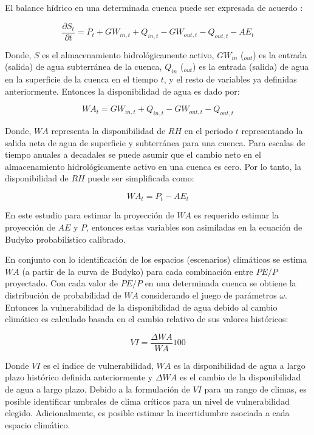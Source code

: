 \documentclass[12pt]{article}
\begin{document}
El balance hídrico en una determinada cuenca puede ser expresada de acuerdo \citep{Singh2015}:

\begin{equation}
\frac{\partial S_{t}}{\partial t} = P_{t} + GW_{in,t} + Q_{in,t} - GW_{out,t} - Q_{out,t} - AE_{t} 
\end{equation}

Donde, $S$ es el almacenamiento hidrológicamente activo, $GW_{in}$ ($_{out}$) es la entrada (salida) de agua subterránea de la cuenca, $Q_{in}$ ($_{out}$) es la entrada (salida) de agua en la superficie de la cuenca en el tiempo $t$, y el resto de variables ya definidas anteriormente. Entonces la disponibilidad de agua es dado por:

\begin{equation}
WA_{t} =  GW_{in,t} + Q_{in,t} - GW_{out,t} - Q_{out,t}
\end{equation}

Donde, $WA$ representa la disponibilidad de $RH$ en el periodo $t$ representando la salida neta de agua de superficie y subterránea para una cuenca. Para escalas de tiempo anuales a decadales se puede asumir que el cambio neto en el almacenamiento hidrológicamente activo en una cuenca es cero. Por lo tanto, la disponibilidad de $RH$ puede ser simplificada como: 

\begin{equation}
WA_{t} = P_{t} - AE_{t}
\end{equation}

En este estudio para estimar la proyección de $WA$ es requerido estimar la proyección de $AE$ y $P$, entonces estas variables son asimiladas en la ecuación de Budyko probabilístico calibrado.

En conjunto con lo identificación de los espacios (escenarios) climáticos se estima $WA$ (a partir de la curva de Budyko) para cada combinación entre $PE/P$ proyectado. Con cada valor de $PE/P$ en una determinada cuenca se obtiene la distribución de probabilidad de $WA$ considerando el juego de parámetros $\omega$. Entonces la vulnerabilidad de la disponibilidad de agua debido al cambio climático es calculado basada en el cambio relativo de sus valores históricos:

\begin{equation}
VI = \frac{\Delta WA}{WA}100
\end{equation}

Donde $VI$ es el índice de vulnerabilidad, $WA$ es la disponibilidad de agua a largo plazo histórico definida anteriormente y $\Delta WA$ es el cambio de la disponibilidad de agua a largo plazo. Debido a la formulación de $VI$ para un rango de climas, es posible identificar umbrales de clima críticos para un nivel de vulnerabilidad elegido. Adicionalmente, es posible estimar la incertidumbre asociada a cada espacio climático.
\end{document}

